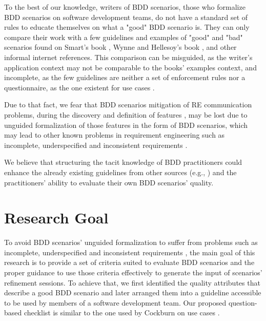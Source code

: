 
To the best of our knowledge, writers of BDD scenarios, those who formalize BDD scenarios on software development teams, do not have a standard set of rules to educate themselves on what a "good" BDD scenario is. They can only compare their work with a few guidelines and examples of "good" and "bad" scenarios found on Smart's book \cite{Smart_2014}, Wynne and Hellesoy's book \cite{Wynne_and_Hellesoy_2012}, and other informal internet references. This comparison can be misguided, as the writer's application context may not be comparable to the books' examples context, and incomplete, as the few guidelines are neither a set of enforcement rules \cite{Phalp_et_dot_al_2011} nor a questionnaire, as the one existent for use cases \cite{Cockburn_2000}. 

Due to that fact, we fear that BDD scenarios mitigation of RE communication problems, during the discovery and definition of features \cite{Ferguson_2017}, may be lost due to unguided formalization of those features in the form of BDD scenarios, which may lead to other known problems in requirement engineering such as incomplete, underspecified and inconsistent requirements \cite{Fernandez_et_dot_al_2017}.

We believe that structuring the tacit knowledge of BDD practitioners could enhance the already existing guidelines from other sources (e.g., \cite{Smart_2014}\cite{Wynne_and_Hellesoy_2012}) and the practitioners' ability to evaluate their own BDD scenarios' quality.

\section{Research Goal}

To avoid BDD scenarios' unguided formalization to suffer from problems such as incomplete, underspecified and inconsistent requirements \cite{Fernandez_et_dot_al_2017}, the main goal of this research is to provide a set of criteria suited to evaluate BDD scenarios and the proper guidance to use those criteria effectively to generate the input of scenarios' refinement sessions. To achieve that, we first identified the quality attributes that describe a good BDD scenario and later arranged them into a guideline accessible to be used by members of a software development team. Our proposed question-based checklist is similar to the one used by Cockburn on use cases \cite{Cockburn_2000}.

